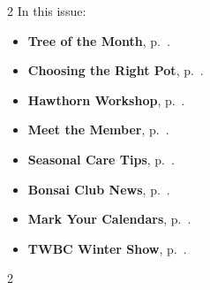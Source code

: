\setlength{\columnsep}{-5.0cm}
\begin{multicols}{2}
    \noindent\textsf{In this issue:}
    \begin{itemize}
        \item \textsf{\textbf{Tree of the Month}}, p.~\pageref{2025-02-contest}.
        \item \textsf{\textbf{Choosing the Right Pot}}, p.~\pageref{2025-02-gossip}.
        \item \textsf{\textbf{Hawthorn Workshop}}, p.~\pageref{2025-02-hawthorn}.
        \item \textsf{\textbf{Meet the Member}}, p.~\pageref{2025-02-roots}.
        \item \textsf{\textbf{Seasonal Care Tips}}, p.~\pageref{2025-02-care}.
        \item \textsf{\textbf{Bonsai Club News}}, p.~\pageref{2025-02-news}.
        \item \textsf{\textbf{Mark Your Calendars}}, p.~\pageref{2025-02-events}.
        \item \textsf{\textbf{TWBC Winter Show}}, p.~\pageref{2025-02-winter}.
    \end{itemize}
    \vfill\null
    \columnbreak

    
\end{multicols}
\pagebreak

\setlength{\columnsep}{0.5cm}
\begin{multicols}{2}
    
    
    
    
    
    
    
    
\end{multicols}
